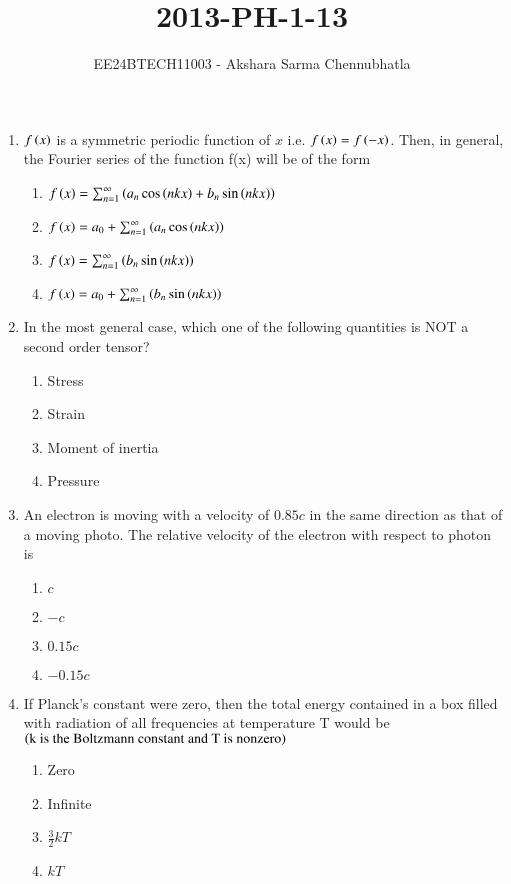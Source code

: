 \documentclass[journal,12pt,onecolumn]{IEEEtran}
\theoremstyle{remark}
\begin{document}

\title{2013-PH-1-13}
\author{EE24BTECH11003 - Akshara Sarma Chennubhatla}
\maketitle
\begin{enumerate}

\item $f\left(x\right)$ is a symmetric periodic function of $x$ i.e. $f\left(x\right) = f\left(-x\right)$. Then, in general, the Fourier series of the function f(x) will be of the form
\begin{enumerate}
\item $f\left(x\right) = \sum_{n=1}^{\infty} \left(a_n \cos\left(nkx\right) + b_n\sin\left(nkx\right)\right)$
\item $f\left(x\right) = a_0 + \sum_{n=1}^{\infty} \left(a_n \cos\left(nkx\right)\right)$
\item $f\left(x\right) = \sum_{n=1}^{\infty} \left(b_n\sin\left(nkx\right)\right)$
\item $f\left(x\right) = a_0 + \sum_{n=1}^{\infty} \left(b_n\sin\left(nkx\right)\right)$
\end{enumerate}

\item In the most general case, which one of the following quantities is NOT a second order tensor?
\begin{enumerate}
\item Stress
\item Strain
\item Moment of inertia
\item Pressure
\end{enumerate}

\item An electron is moving with a velocity of $0.85c$ in the same direction as that of a moving photo. The relative velocity of the electron with respect to photon is
\begin{enumerate}
\item $c$
\item $-c$
\item $0.15c$
\item $-0.15c$
\end{enumerate}

\item If Planck's constant were zero, then the total energy contained in a box filled with radiation of all frequencies at temperature T would be $\left(\text{k is the Boltzmann constant and T is nonzero}\right)$
\begin{enumerate}
\item Zero
\item Infinite
\item $\frac{3}{2}kT$
\item $kT$
\end{enumerate}


\end{enumerate}
\end{document}
